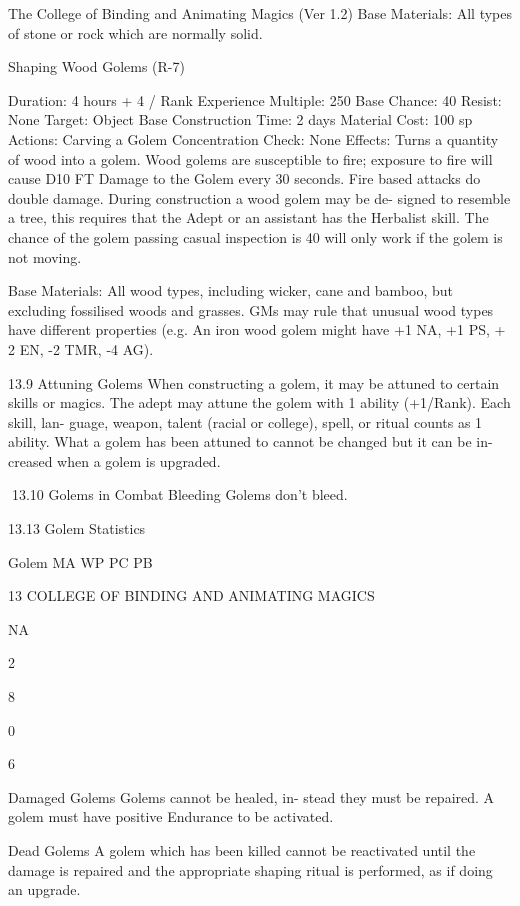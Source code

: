 \begin{Chapter}{The College of Binding and Animating Magics (Ver 1.2)}
Base  Materials:  All  types  of  stone  or  rock  which 
are normally solid. 

Shaping Wood Golems (R-7) 

Duration: 4 hours + 4 / Rank 
Experience Multiple: 250 
Base Chance: 40%
Resist: None 
Target: Object 
Base Construction Time: 2 days 
Material Cost: 100 sp 
Actions: Carving a Golem 
Concentration Check: None 
Effects:  Turns  a  quantity  of  wood  into  a  golem. 
Wood  golems  are  susceptible  to  fire;  exposure  to 
fire will cause D10 FT Damage to the Golem every 
30  seconds.  Fire  based  attacks  do  double  damage. 
During  construction  a  wood  golem  may  be  de-
signed  to  resemble  a  tree,  this  requires  that  the 
Adept  or  an  assistant  has  the  Herbalist  skill.  The 
chance  of  the  golem  passing  casual  inspection  is 
40%
will only work if the golem is not moving. 

Base  Materials:  All  wood  types,  including  wicker, 
cane  and  bamboo,  but  excluding  fossilised  woods 
and  grasses.  GMs  may  rule  that  unusual  wood 
types  have  different  properties  (e.g. An  iron  wood 
golem might have +1 NA, +1 PS, + 2 EN, -2 TMR, 
-4 AG). 

13.9 Attuning Golems 
When  constructing  a  golem,  it  may  be  attuned  to 
certain  skills  or  magics.  The  adept  may  attune  the 
golem  with  1  ability  (+1/Rank).  Each  skill,  lan-
guage,  weapon,  talent  (racial  or  college),  spell,  or 
ritual  counts  as  1  ability.  What  a  golem  has  been 
attuned  to  cannot  be  changed  but  it  can  be  in-
creased when a golem is upgraded. 

 

 

13.10 Golems in Combat 
Bleeding Golems don’t bleed. 

13.13 Golem Statistics 

Golem  MA  WP  PC  PB 

13 COLLEGE OF BINDING AND ANIMATING MAGICS 

NA 

2 

8 

0 

6 

Damaged  Golems  Golems  cannot  be  healed,  in-
stead  they  must  be  repaired.  A  golem  must  have 
positive Endurance to be activated. 

Dead  Golems  A  golem  which  has  been  killed 
cannot  be  reactivated  until  the  damage  is  repaired 
and the appropriate shaping ritual is performed, as 
if doing an upgrade. 


\end{Chapter}

